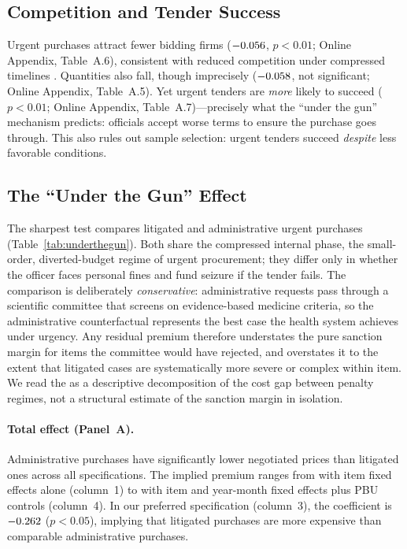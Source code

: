 \subsection{Competition and Tender Success}
\label{sec:competition}

Urgent purchases attract \BPfirmsPctHeadline{} fewer bidding firms ($-0.056$, $p < 0.01$; Online Appendix, Table~A.6), consistent with reduced competition under compressed timelines \citep{bulow1996auctions}. Quantities also fall, though imprecisely ($-0.058$, not significant; Online Appendix, Table~A.5). Yet urgent tenders are \BPsuccessPP{} \emph{more} likely to succeed ($p < 0.01$; Online Appendix, Table~A.7)---precisely what the ``under the gun'' mechanism predicts: officials accept worse terms to ensure the purchase goes through. This also rules out sample selection: urgent tenders succeed \emph{despite} less favorable conditions.

\subsection{The ``Under the Gun'' Effect}
\label{sec:utg}

The sharpest test compares litigated and administrative urgent purchases (Table~\ref{tab:underthegun}). Both share the compressed internal phase, the small-order, diverted-budget regime of urgent procurement; they differ only in whether the officer faces personal fines and fund seizure if the tender fails. The comparison is deliberately \emph{conservative}: administrative requests pass through a scientific committee that screens on evidence-based medicine criteria, so the administrative counterfactual represents the best case the health system achieves under urgency. Any residual premium therefore understates the pure sanction margin for items the committee would have rejected, and overstates it to the extent that litigated cases are systematically more severe or complex within item. We read the \BPutgPctRange{} as a descriptive decomposition of the cost gap between penalty regimes, not a structural estimate of the sanction margin in isolation.


\paragraph{Total effect (Panel~A).}
Administrative purchases have significantly lower negotiated prices than litigated ones across all specifications. The implied premium ranges from \BPutgPctItem{} with item fixed effects alone (column~1) to \BPutgPctItemYM{} with item and year-month fixed effects plus PBU controls (column~4). In our preferred specification (column~3), the coefficient is $-0.262$ ($p < 0.05$), implying that litigated purchases are \BPutgPct{} more expensive than comparable administrative purchases.

